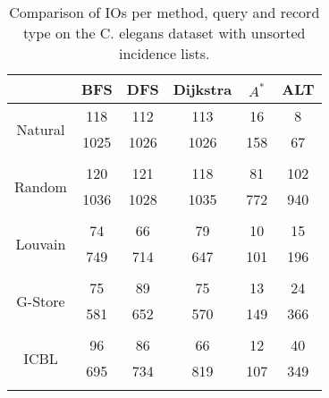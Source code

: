 \begin{table}
	\begin{center}
		 \begin{tabular}[c]{c c c c c c} \toprule
			  & BFS & DFS & Dijkstra & $A^*$  & ALT \\ \midrule 
 			\multirow{2}{*}{Natural}  & 118 & 112 & 113 & 16 & 8 \\ 
 				 & 1025 & 1026 & 1026 & 158 & 67 \\ 
 				&&&&& \\[-0.5em]
 			\multirow{2}{*}{Random}  & 120 & 121 & 118 & 81 & 102 \\ 
 				 & 1036 & 1028 & 1035 & 772 & 940 \\ 
 				&&&&& \\[-0.5em]
 			\multirow{2}{*}{Louvain}  & 74 & 66 & 79 & 10 & 15 \\ 
 				 & 749 & 714 & 647 & 101 & 196 \\ 
 				&&&&& \\[-0.5em]
 			\multirow{2}{*}{G-Store}  & 75 & 89 & 75 & 13 & 24 \\ 
 				 & 581 & 652 & 570 & 149 & 366 \\ 
 				&&&&& \\[-0.5em]
 			\multirow{2}{*}{ICBL}  & 96 & 86 & 66 & 12 & 40 \\ 
 				 & 695 & 734 & 819 & 107 & 349 \\ 
 				&&&&& \\[-0.5em]
 					\end{tabular}  
  	 \end{center}
	 \caption{Comparison of IOs per method, query and record type on the C. elegans dataset with unsorted incidence lists.}
	 \label{ce-uns}
\end{table}
